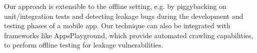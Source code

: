 Our approach is extensible to the offline setting, e.g. by piggybacking on unit/integration tests and detecting leakage bugs during the development and testing phases of a mobile app. Our technique can also be integrated with frameworks like AppsPlayground, which provide automated crawling capabilities, to perform offline testing for leakage vulnerabilities.